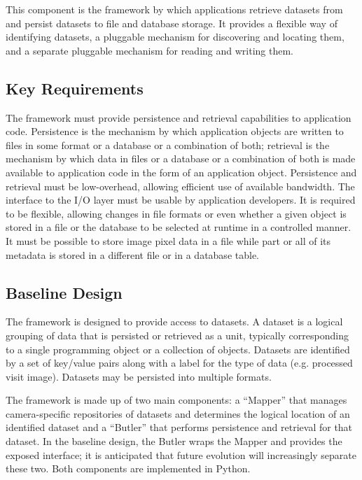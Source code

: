 \documentclass[DM,toc]{lsstdoc}
\begin{document}
This component is the framework by which applications retrieve datasets from
and persist datasets to file and database storage.  It provides a flexible way
of identifying datasets, a pluggable mechanism for discovering and locating
them, and a separate pluggable mechanism for reading and writing them.

\subsection{Key Requirements}\label{butler-requirements}

The framework must provide persistence and retrieval capabilities to
application code. Persistence is the mechanism by which application
objects are written to files in some format or a database or a
combination of both; retrieval is the mechanism by which data in files
or a database or a combination of both is made available to application
code in the form of an application object. Persistence and retrieval
must be low-overhead, allowing efficient use of available bandwidth. The
interface to the I/O layer must be usable by application developers. It
is required to be flexible, allowing changes in file formats or even
whether a given object is stored in a file or the database to be
selected at runtime in a controlled manner. It must be possible to store
image pixel data in a file while part or all of its metadata is stored
in a different file or in a database table.

\subsection{Baseline Design}\label{butler-design}

The framework is designed to provide access to datasets. A dataset is a logical
grouping of data that is persisted or retrieved as a unit, typically
corresponding to a single programming object or a collection of objects.
Datasets are identified by a set of key/value pairs along with a label for the
type of data (e.g. processed visit image).  Datasets may be persisted into
multiple formats.

The framework is made up of two main components: a ``Mapper'' that manages
camera-specific repositories of datasets and determines the
logical location of an identified dataset and a ``Butler'' that performs
persistence and retrieval for that dataset.  In the baseline design, the Butler
wraps the Mapper and provides the exposed interface; it is anticipated that
future evolution will increasingly separate these two.  Both components are
implemented in Python.
\end{document}
